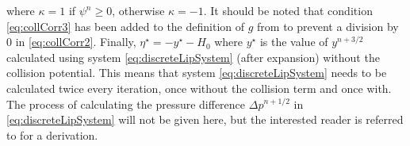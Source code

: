 %
where $\kappa = 1$ if $\psi^n \geq 0$, otherwise $\kappa = -1$. It should be noted that condition \eqref{eq:collCorr3} has been added to the definition of $g$ from \cite{Ducceschi2021} to prevent a division by 0 in \eqref{eq:collCorr2}. Finally, $\eta^\star = -y^{\star} - H_0$ where $y^{\star}$ is the value of $y^{n+3/2}$ calculated using system \eqref{eq:discreteLipSystem} (after expansion) without the collision potential. This means that system \eqref{eq:discreteLipSystem} needs to be calculated twice every iteration, once without the collision term and once with. The process of calculating the pressure difference $\Delta p^{n+1/2}$ in \eqref{eq:discreteLipSystem} will not be given here, but the interested reader is referred to \cite[Ch. 5]{Harrison2018} for a derivation.



